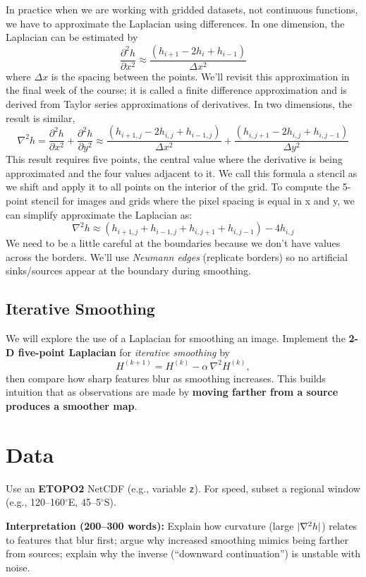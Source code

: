 \documentclass[final,a4paper,12pt]{article}
\begin{document}
In practice when we are working with gridded datasets, not continuous functions, we have to approximate the Laplacian using differences.  In one dimension, the Laplacian can be estimated by
\[
  \frac{\partial^2 h}{\partial x^2} \approx \frac{(h_{i+1} - 2 h_{i} + h_{i-1})}{\Delta x^2}
\]
where $\Delta x$ is the spacing between the points. We'll revisit this approximation in the final week of the course; it is called a finite difference approximation and is derived from Taylor series approximations of derivatives.  In two dimensions, the result is similar,
\[
  \nabla^2 h = \frac{\partial^2 h}{\partial x^2} + \frac{\partial^2 h}{\partial y^2} \approx \frac{(h_{i+1,j} - 2 h_{i,j} + h_{i-1,j})}{\Delta x^2} + \frac{(h_{i,j+1} - 2 h_{i,j} + h_{i,j-1})}{\Delta y^2}
\]
This result requires five points, the central value where the derivative is being approximated and the four values adjacent to it. We call this formula a stencil as we shift and apply it to all points on the interior of the grid.  To compute the 5-point stencil for images and grids where the pixel spacing is equal in x and y, we can simplify approximate the Laplacian as:
\begin{equation}
  \nabla^2 h \approx (h_{i+1,j} + h_{i-1,j} + h_{i,j+1} + h_{i,j-1}) - 4 h_{i,j}
  \label{eq:stencil}
\end{equation}
We need to be a little careful at the boundaries because we don't have values across the borders.  We'll use \emph{Neumann edges} (replicate borders) so no artificial sinks/sources appear at the boundary during smoothing.

\subsection*{Iterative Smoothing}
We will explore the use of a Laplacian for smoothing an image.  Implement the \textbf{2-D five-point Laplacian} for \emph{iterative smoothing} by
\[
  H^{(k+1)} = H^{(k)} - \alpha\,\nabla^2 H^{(k)},
\]
then compare how sharp features blur as smoothing increases. This builds intuition that as observations are made by \textbf{moving farther from a source produces a smoother map}.

\section*{Data}
Use an \textbf{ETOPO2} NetCDF (e.g., variable \texttt{z}). For speed, subset a regional window (e.g., 120--160$^\circ$E, 45--5$^\circ$S).

\textbf{Interpretation (200--300 words):} Explain how curvature (large $|\laplacian{h}|$) relates to features that blur first; argue why increased smoothing mimics being farther from sources; explain why the inverse (“downward continuation”) is unstable with noise.
\end{document}
